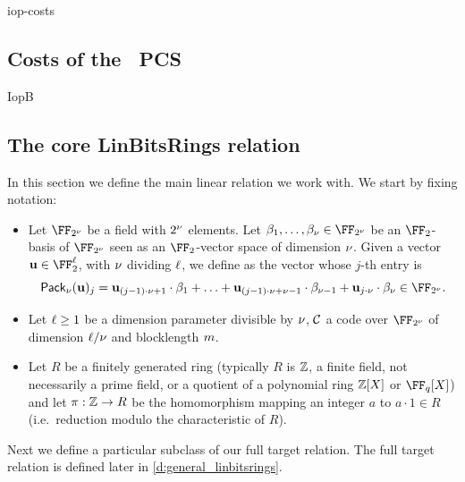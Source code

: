 \begin{lncsappendix}{iop-costs}
\iflncs\subsection{Costs of the \ftwoz\ PCS}\label{a:iop_costs}\fi


\begin{lncsmove}{IopB}
\subsection{The core LinBitsRings relation}\label{s:linmodfieldbin}




\renewcommand{\ringtwo}{\FF_q}
\renewcommand{\ringmorphism}{\pi_q}
In this section we define the main linear relation we work with. We start by fixing notation:
\iflncs\else\begin{itemize}[leftmargin=*]\fi
    \iflncs\else\item\fi{} Let $\comfield$ be a field with $2^{\nu}$ elements. Let
%
$
\beta_1, \ldots, \beta_\comfieldexp \in \comfield
$
%
be an $\FF_2$-basis of $\comfield$ seen as an $\FF_2$-vector space of dimension $\nu$. Given a vector $\uu\in \FF_2^\codedim$, with $\nu$ dividing $\ell$, we define
%
\lncsmath{
\pack(\uu)\in \comfield^{\codedim/\comfieldexp}
}
as the vector whose $j$-th entry is
%
$$
\pack(\uu)_{j} = \uu_{(j-1)\cdot \comfieldexp +1 }\cdot \beta_1 + \ldots + \uu_{(j-1)\cdot \comfieldexp +\comfieldexp-1 }\cdot \beta_{\comfieldexp-1}+\uu_{j \cdot \comfieldexp} \cdot \beta_\comfieldexp \in \comfield.
$$
%
\iflncs\else\item \fi
 Let $\ell\geq 1$ be a dimension parameter divisible by $\nu$, $\mathcal{C}$ a code over $\comfield$ of dimension $\ell/\nu$ and blocklength $m$.  
 \iflncs\else\item\fi{}  Let $R$ be a finitely generated ring (typically $R$ is $\mathbb{Z}$, a finite field, not necessarily a prime field, or a quotient of a polynomial ring $\mathbb{Z}[X]$ or $\FF_q[X]$) and let $\pi:\mathbb{Z} \to R$  be the  homomorphism mapping an integer $a$ to $a\cdot 1\in R$ (i.e.\ reduction modulo the characteristic of $R$).
\iflncs\else\end{itemize}\fi

Next we define  a particular subclass of our full target relation. The full target relation is defined later in \cref{d:general_linbitsrings}.


\end{lncsmove}
\end{lncsappendix}
